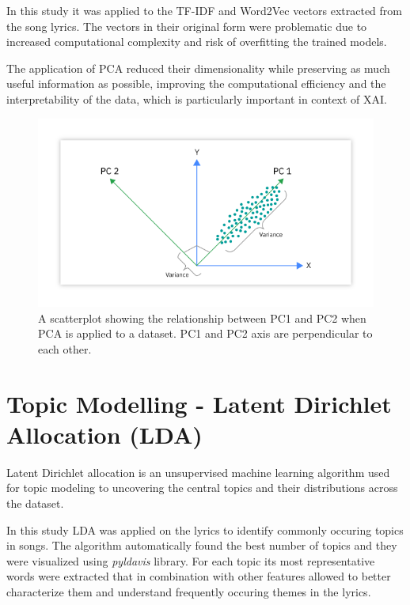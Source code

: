 In this study it was applied to the TF-IDF and Word2Vec vectors extracted from
the song lyrics. The vectors in their original form were problematic due  to
increased computational complexity and risk of overfitting the trained models.

The application of PCA reduced their dimensionality while preserving as much
useful information as possible, improving the computational efficiency and 
the interpretability of the data, which is particularly important in context of
XAI.

\begin{center}
\begin{figure}[H]
  \centering
  \includegraphics[width=6in]{img/pca.png}
  \caption{A scatterplot showing the relationship between PC1 and PC2 when PCA
  is applied to a dataset. PC1 and PC2 axis are perpendicular to each other.\cite{pca}}
  \label{Figure:pca}
\end{figure}
\end{center}


\section{Topic Modelling - Latent Dirichlet Allocation (LDA)}
\label{sec:topicmodelling}

Latent Dirichlet allocation is an unsupervised machine learning algorithm used
for topic modeling to uncovering the central topics and their distributions
across the dataset.\cite{lda}

In this study LDA was applied on the lyrics to identify commonly occuring
topics in songs. The algorithm automatically found the best number of topics
and they were visualized using \textit{pyldavis}\cite{pylda} library. For each
topic its most representative words were extracted that in combination with
other features allowed to better characterize them and understand frequently
occuring themes in the lyrics.




